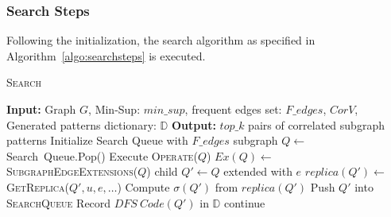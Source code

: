 {\subsubsection{Search Steps}
\label{subsec:search-steps}
Following the initialization, the search algorithm as specified in
Algorithm~\ref{algo:searchsteps} is executed.
\begin{algorithm}
	\dontprintsemicolon
	\caption{\textsc{Search}}\label{algo:searchsteps}
	\nonl \textbf{Input:} Graph $G$, {\sf Min-Sup:} $min\_sup$, frequent edges
	set: $F\_edges$, $CorV$, Generated patterns dictionary: $\mathbb{D}$ \;
	\nonl \textbf{Output:} $top\_k$ pairs of correlated subgraph patterns  \;
	Initialize {\sf Search Queue} with $F\_edges$ \;
	{
		subgraph $Q \leftarrow$ {\sf Search\
		Queue.Pop()}\;
		Execute \textsc{Operate($Q$)}\;
		$Ex(Q) \leftarrow $ \textsc{SubgraphEdgeExtensions($Q$)}\;
		{
			child $Q'\leftarrow Q$ extended with $e$\;
			{
				$replica(Q') \leftarrow $ \textsc{GetReplica($Q', u, e, \dots$)}\;
				Compute $\sigma(Q')$ from $replica(Q')$\;
				{
					Push $Q'$ into \textsc{SearchQueue}\;
				}
				Record $DFS\ Code(Q')$ in $\mathbb{D}$\;
			}
			\Else
			{
				continue\;
			}
		}
	}
		\;
\end{algorithm}

}
